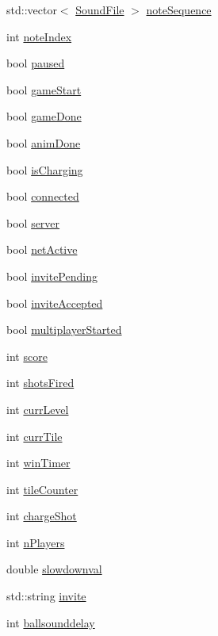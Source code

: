 \begin{DoxyCompactItemize}
\item 
std\-::vector$<$ \hyperlink{SoundManager_8h_a05cf79926d9921eb07e70e460b021307}{Sound\-File} $>$ \hyperlink{classTileGame_a89f75175ed666995704d8bad09762612}{note\-Sequence}
\item 
int \hyperlink{classTileGame_ae301ffc70ac15755e4fd6f8561aeaf30}{note\-Index}
\item 
bool \hyperlink{classTileGame_ac76eb85a5597f84146e49c92f7edc877}{paused}
\item 
bool \hyperlink{classTileGame_a276db8a3e88eea0914e6f6262791ee89}{game\-Start}
\item 
bool \hyperlink{classTileGame_a8fb8cd476fcf067cdfe0495fbf9f417e}{game\-Done}
\item 
bool \hyperlink{classTileGame_abdd2197b16e59e2035984882aaebf9e3}{anim\-Done}
\item 
bool \hyperlink{classTileGame_ac1c6b430452c30f0c546ac15918b765f}{is\-Charging}
\item 
bool \hyperlink{classTileGame_aa5b3986f4fdfaefddd5a85b796be3a36}{connected}
\item 
bool \hyperlink{classTileGame_a8f1f5171595cb9819f47ad2c9849e810}{server}
\item 
bool \hyperlink{classTileGame_a475333f8fc083d4ea2fea31506834382}{net\-Active}
\item 
bool \hyperlink{classTileGame_ae23eafd71c3ecbccded93d7776c21445}{invite\-Pending}
\item 
bool \hyperlink{classTileGame_abeb262bc462d088865945f3bb4bff513}{invite\-Accepted}
\item 
bool \hyperlink{classTileGame_a94c15c528caf27fa578ddbfafd0e5a7f}{multiplayer\-Started}
\item 
int \hyperlink{classTileGame_abba0100f7c52d2a9ae1bfa0f5bbee4a5}{score}
\item 
int \hyperlink{classTileGame_a23df8d17a61584279dbec39ef31092cc}{shots\-Fired}
\item 
int \hyperlink{classTileGame_ade2ff1b55b30e055c67907574805c711}{curr\-Level}
\item 
int \hyperlink{classTileGame_a95f339ca3fee081b681bc04ca4db4b69}{curr\-Tile}
\item 
int \hyperlink{classTileGame_a05d9bbf0aebd4822ed518804eeb899fa}{win\-Timer}
\item 
int \hyperlink{classTileGame_a0a94db2f1d3da7a330e415d48c18e763}{tile\-Counter}
\item 
int \hyperlink{classTileGame_a1a8592c70c05bb2197c9b3cb0a33478e}{charge\-Shot}
\item 
int \hyperlink{classTileGame_a232f92064d80b722b022a3845be35b9e}{n\-Players}
\item 
double \hyperlink{classTileGame_a8b95ee0f509c6e7b170f392d755d2e59}{slowdownval}
\item 
std\-::string \hyperlink{classTileGame_a2aeaa1575631d37600e5c66bb2388a7b}{invite}
\item 
int \hyperlink{classTileGame_ad2760c41885714fa60f8c8b6fd0276b2}{ballsounddelay}
\end{DoxyCompactItemize}


